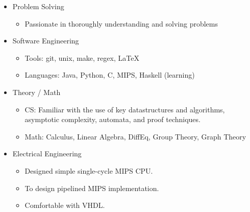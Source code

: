 \documentclass[18pt]{article}
\providecommand{\tightlist}{
    \setlength{\itemsep}{0pt}\setlength{\parskip}{0pt}
}
\begin{document}
\begin{multicols}{2}
\begin{itemize}
        \item Problem Solving
        \begin{itemize}\tightlist
          \item Passionate in thoroughly understanding and solving problems
        \end{itemize}

        \item Software Engineering
        \begin{itemize}\tightlist
          \item Tools: git, unix, make, regex, \LaTeX
          \item Languages: Java, Python, C, MIPS, Haskell (learning)
        \end{itemize}

        \item Theory / Math
        \begin{itemize}\tightlist
          \item CS: Familiar with the use of key datastructures and algorithms, asymptotic complexity, automata, and proof techniques.
          \item Math: Calculus, Linear Algebra, DiffEq, Group Theory, Graph Theory
        \end{itemize}

        \item Electrical Engineering
        \begin{itemize}\tightlist
          \item Designed simple single-cycle MIPS CPU.
          \item To design pipelined MIPS implementation.
          \item Comfortable with VHDL.
        \end{itemize}

      \end{itemize} %

  \end{multicols}
\end{document}
